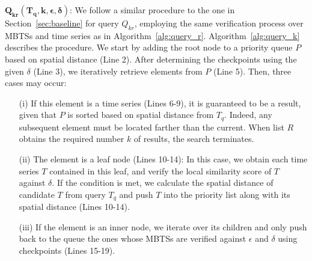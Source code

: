\noindent $\mathbold{Q_{kr}(T_q, k, \epsilon, \delta)}$: We follow a similar procedure to the one in Section~\ref{sec:baseline} for query $Q_{kr}$, employing the same verification process over MBTSs and time series as in Algorithm~\ref{alg:query_r}. Algorithm~\ref{alg:query_k} describes the procedure. We start by adding the root node to a priority queue $P$ based on spatial distance (Line 2). After determining the checkpoints using the given $\delta$ (Line 3), we iteratively retrieve elements from $P$ (Line 5). Then, three cases may occur: 
\begin{enumerate}
\item[(i)] If this element is a time series (Lines 6-9), it is guaranteed to be a result, given that $P$ is sorted based on spatial distance from $T_q$. Indeed, any subsequent element must be located farther than the current. When list $R$ obtains the required number $k$ of results, the search terminates. 
\item[(ii)] The element is a leaf node (Lines 10-14): In this case, we obtain each time series $T$ contained in this leaf, and verify the local similarity score of $T$ against $\delta$. If the condition is met, we calculate the spatial distance of candidate $T$ from query $T_q$ and push $T$ into the priority list along with its spatial distance (Lines 10-14). 
\item[(iii)] If the element is an inner node, we iterate over its children and only push back to the queue the ones whose MBTSs are verified against $\epsilon$ and $\delta$ using checkpoints (Lines 15-19).
\end{enumerate}

